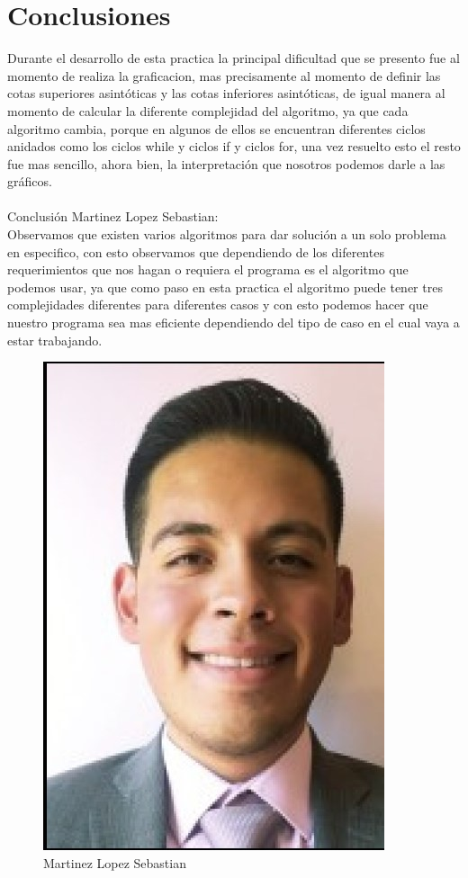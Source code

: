 \documentclass[12pt,twoside]{article}
\begin{document}
\section{Conclusiones}
Durante el desarrollo de esta practica la principal dificultad que se presento fue al momento de realiza la graficacion, mas precisamente al momento de definir las cotas superiores asintóticas y las cotas inferiores asintóticas, de igual manera al momento de calcular la diferente complejidad del algoritmo, ya que cada algoritmo cambia, porque en algunos de ellos se encuentran diferentes ciclos anidados como los ciclos while y ciclos if y ciclos for, una vez resuelto esto el resto fue mas sencillo, ahora bien, la interpretación que nosotros podemos darle a las gráficos.
\\
\\
Conclusión Martinez Lopez Sebastian:\\
Observamos que existen varios algoritmos para dar solución a un solo problema en especifico, con esto observamos que dependiendo de los diferentes requerimientos que nos hagan o requiera el programa es el algoritmo que podemos usar, ya que como paso en esta practica el algoritmo puede tener tres complejidades diferentes para diferentes casos y con esto podemos hacer que nuestro programa sea mas eficiente dependiendo del tipo de caso en el cual vaya a estar trabajando. 
\begin{figure}[h!]
\centering
\includegraphics[scale=0.5]{seb1.jpg}
\caption{Martinez Lopez Sebastian}
\label{fig:universe}
\end{figure}
\end{document}
